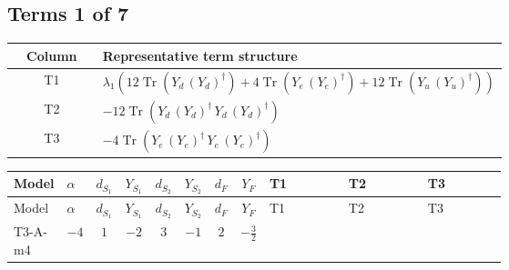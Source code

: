 \documentclass[8pt]{article}
\begin{document}
\begin{landscape}
\subsection*{Terms 1 of 7}
\begin{center}
\begin{tabular}{@{}c >{\raggedright\arraybackslash}p{0.82\linewidth}@{}}
\toprule
Column & Representative term structure \\
\midrule
T1 & \(\displaystyle {\lambda_1} (12 \operatorname{Tr}\!\left({Y_d}\,\left({Y_d}\right)^{\dagger}\right)+4 \operatorname{Tr}\!\left({Y_e}\,\left({Y_e}\right)^{\dagger}\right)+12 \operatorname{Tr}\!\left({Y_u}\,\left({Y_u}\right)^{\dagger}\right))\) \\
\midrule
T2 & \(\displaystyle -12 \operatorname{Tr}\!\left({Y_d}\,\left({Y_d}\right)^{\dagger}\,{Y_d}\,\left({Y_d}\right)^{\dagger}\right)\) \\
\midrule
T3 & \(\displaystyle -4 \operatorname{Tr}\!\left({Y_e}\,\left({Y_e}\right)^{\dagger}\,{Y_e}\,\left({Y_e}\right)^{\dagger}\right)\) \\
\midrule
\bottomrule
\end{tabular}
\end{center}
\smallskip
\tiny
\begin{longtable}{@{}llcccccc >{\raggedright\arraybackslash}p{0.21\linewidth} >{\raggedright\arraybackslash}p{0.21\linewidth} >{\raggedright\arraybackslash}p{0.21\linewidth}@{}}
\toprule
Model & $\alpha$ & $d_{S_1}$ & $Y_{S_1}$ & $d_{S_2}$ & $Y_{S_2}$ & $d_F$ & $Y_F$ & T1 & T2 & T3 \\
\midrule
\endfirsthead
\toprule
Model & $\alpha$ & $d_{S_1}$ & $Y_{S_1}$ & $d_{S_2}$ & $Y_{S_2}$ & $d_F$ & $Y_F$ & T1 & T2 & T3 \\
\midrule
\endhead
T3-A-m4 & $-4$ & $1$ & $-2$ & $3$ & $-1$ & $2$ & $-\frac{3}{2}$ & \scriptsize\adjustbox{max width=\linewidth}{$\begin{gathered} {\lambda_1} (12 \operatorname{Tr}\!\left({Y_d}\,\left({Y_d}\right)^{\dagger}\right)+4 \operatorname{Tr}\!\left({Y_e}\,\left({Y_e}\right)^{\dagger}\right)+12 \operatorname{Tr}\!\left({Y_u}\,\left({Y_u}\right)^{\dagger}\right))\end{gathered}$} & \scriptsize\adjustbox{max width=\linewidth}{$\begin{gathered} -12 \operatorname{Tr}\!\left({Y_d}\,\left({Y_d}\right)^{\dagger}\,{Y_d}\,\left({Y_d}\right)^{\dagger}\right)\end{gathered}$} & \scriptsize\adjustbox{max width=\linewidth}{$\begin{gathered} -4 \operatorname{Tr}\!\left({Y_e}\,\left({Y_e}\right)^{\dagger}\,{Y_e}\,\left({Y_e}\right)^{\dagger}\right)\end{gathered}$} \\

\end{longtable}
\end{landscape}
\end{document}
